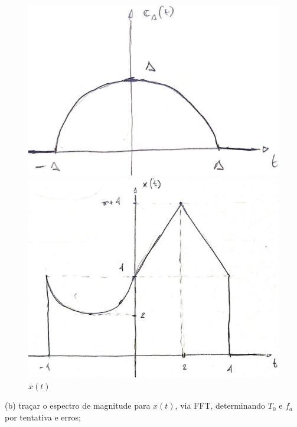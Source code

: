 \documentclass[10pt]{article}
\begin{document}
\begin{figure}[h]
\begin{minipage}{9cm}
        \caption{$r_{\Delta}(t)$}
    \end{minipage}
    \begin{minipage}{9.5cm}
        \includegraphics[scale=0.2]{questao2a3.jpeg}
        \centering
        \caption{$c_{\Delta}(t)$}
    \end{minipage}
    \begin{minipage}{9cm}
        \includegraphics[scale=0.2]{questao2a4.jpeg}
        \centering
        \caption{$x(t)$}
    \end{minipage}   
\end{figure}

\newpage

(b) traçar o espectro de magnitude para $x(t)$, via FFT, determinando $T_0$ e $f_a$ por tentativa e erros;
\end{document}
